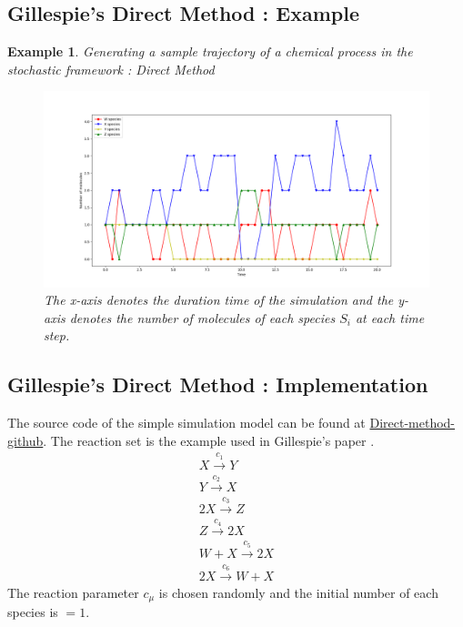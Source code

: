 \documentclass[11pt,a4paper]{article}
\newtheorem{example}[theorem]{Example}
\begin{document}
\subsection{Gillespie's Direct Method : Example}
\begin{example}{Generating a sample trajectory of a chemical process in the stochastic framework : Direct Method }
    \begin{figure}[!h]
    \centering
    \includegraphics[width=1\textwidth]{Images/Figure_1.png}
    \caption{The x-axis denotes the duration time of the simulation and the y-axis denotes the number of molecules of each species $S_{i}$ at each time step.}
    \label{fig: Single sample trajectory}
    \end{figure}
\end{example}

\subsection{Gillespie's Direct Method : Implementation}
The source code of the simple simulation model can be found at \href{https://github.com/Prateeba/TRAN-F501-Internship-201819/tree/master/Code/G_first_reaction}{Direct-method-github}. The reaction set is the example used in Gillespie's paper \cite{gillespie_general_1976}.
\begin{gather}
  {X \xrightarrow{c_{1}} Y}      \\
  {Y \xrightarrow{c_{2}} X}      \\
  {2X \xrightarrow{c_{3}} Z}     \\
  {Z \xrightarrow{c_{4}} 2X}     \\
  {W + X \xrightarrow{c_{5}} 2X} \\
  {2X \xrightarrow{c_{6}} W + X}
\end{gather}
The reaction parameter $c_{\mu}$ is chosen randomly and the initial number of each species is $= 1$.
\end{document}
